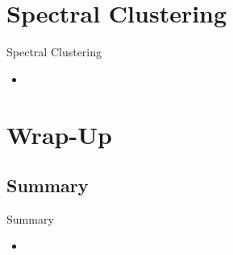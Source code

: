 %


\section{Spectral Clustering}

\begin{frame}{Spectral Clustering}{}
	\begin{itemize}
		\item
	\end{itemize}
\end{frame}


\section{Wrap-Up}

\subsection{Summary}

\begin{frame}{Summary}{}
	\begin{itemize}
		\item 
	\end{itemize}
\end{frame}


